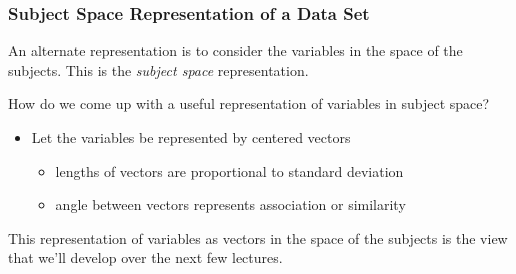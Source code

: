 \documentclass{beamer}
\begin{document}
\begin{frame}
  \frametitle{Subject Space Representation of a Data Set}

\begin{small}

An alternate representation is to consider the variables in the space of the subjects. This is the \emph{subject space} representation.

\medskip

How do we come up with a useful representation of variables in subject space?
\begin{itemize}
 \item Let the variables be represented by centered vectors
 \begin{itemize}
    \item lengths of vectors are proportional to standard deviation
    \item angle between vectors represents association or similarity
 \end{itemize}
\end{itemize}
\end{small}

\begin{center}

\end{center}

This representation of variables as vectors in the space of the subjects is the view that we'll develop over the next few lectures.


\end{frame}
\end{document}
